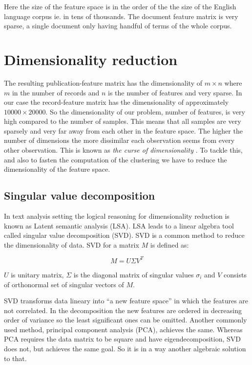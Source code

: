 Here the size of the feature space is in the order of the the 
size of the English language corpus ie. in tens of thousands. The 
document feature matrix is very sparse, a single document only 
having handful of terms of the whole corpus.



\section{Dimensionality reduction}
\label{sec:dimensionalityreduction}
The resulting publication-feature matrix has the dimensionality 
of $m \times n$ where $m$ in 
the number of records and $n$ is the number of features and very 
sparse. In our case the record-feature matrix has the 
dimensionality of approximately $10000 \times 20000$. 
So the dimensionality of our problem, number of features, is very
high compared to the number of samples. This means that all
samples are very sparsely and very far away from each other in the 
feature space.
The higher the number of dimensions the more 
dissimilar each observation seems from every other observation. 
This is known as \emph{the curse of dimensionality} \cite{trunk_problem_1979}.
To tackle this, and also to fasten the computation of the 
clustering we have to reduce the dimensionality of the feature space.


\subsection{Singular value decomposition}
In text analysis setting the logical reasoning for dimensionality
reduction is known as Latent semantic analysis (LSA)\cite{dumais_using_1988}.
LSA leads to a linear algebra tool called singular value 
decomposition (SVD). SVD is a common method to reduce the 
dimensionality of data. SVD for a matrix $M$ is defined as:

\begin{equation}
 M = U \Sigma V^T
\end{equation}

$U$ is unitary matrix, $\Sigma$ is the diagonal matrix of singular
values $\sigma_i$ and $V$ consists of orthonormal set of singular 
vectors of $M$.

SVD transforms data lineary into ``a new feature space'' in which the 
features are not correlated. In the decomposition the new features are 
ordered in decreasing order of variance so the least significant 
ones can be omitted. 
Another commonly used method, principal component analysis (PCA), 
achieves the same.
Whereas PCA requires the data matrix to be square and have 
eigendecomposition, SVD does not, but achieves the same goal.
So it is in a way another algebraic solution to that.


